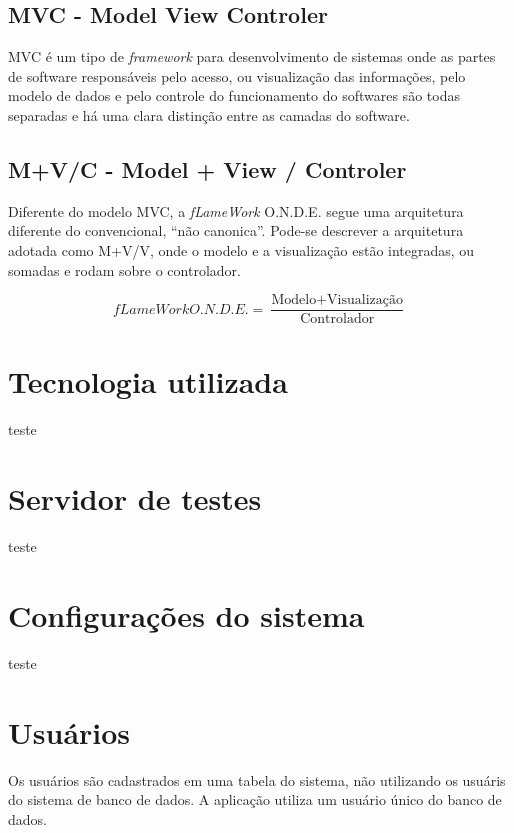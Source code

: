 \documentclass[9pt]{report}
\begin{document}
  \section{MVC - Model View Controler}

     MVC é um tipo de \textit{framework} para desenvolvimento de sistemas
     onde as partes de software responsáveis pelo acesso, ou visualização
     das informações, pelo modelo de dados e pelo controle do funcionamento
     do softwares são todas separadas e há uma clara distinção entre as
     camadas do software.

     \section{M+V/C - Model + View / Controler}

     Diferente do modelo MVC, a \textit{fLameWork} O.N.D.E. segue uma
     arquitetura diferente do convencional, ``não canonica''. Pode-se
     descrever a arquitetura adotada como M+V/V, onde o modelo e a
     visualização estão integradas, ou somadas e rodam sobre o controlador.

     $$fLameWork O.N.D.E. = \frac{\textrm{Modelo} + \textrm{Visualização}}{\textrm{Controlador}}$$
     
   \chapter{Tecnologia utilizada}
  
     teste
   
     \chapter{Servidor de testes}
   
     teste
    
     \chapter{Configurações do sistema}
   
     teste
    
    \chapter{Usuários}
   
    Os usuários são cadastrados em uma tabela do sistema,
    não utilizando os usuáris do sistema de banco de dados.
    A aplicação utiliza um usuário único do banco de dados.
    
\end{document}
